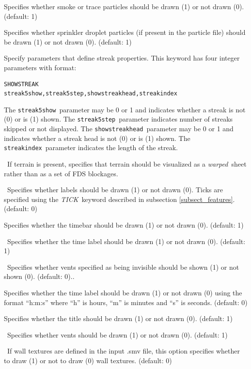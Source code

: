 \documentclass[11pt,twoside]{book}
\begin{document}
Specifies whether smoke or trace particles
should be drawn (1) or not drawn (0). (default: 1)

Specifies whether
sprinkler droplet particles (if present in the particle file)
should be drawn (1) or not drawn (0).
(default: 1)

Specify parameters that define streak properties.  This keyword
has four integer parameters with format:
\begin{lstlisting}
SHOWSTREAK
streak5show,streak5step,showstreakhead,streakindex
\end{lstlisting}
The {\tt streak5show}\ parameter may be 0 or 1 and indicates whether a
streak is not (0) or is (1) shown. The {\tt streak5step}\ parameter
indicates number of streaks skipped or not displayed.
The {\tt showstreakhead}\ parameter may be 0 or 1 and indicates
whether a streak head is not (0) or is (1) shown.
The {\tt streakindex}\ parameter indicates the length of the streak.


\ If terrain is present, specifies that terrain
should be visualized as a {\em warped}\ sheet
rather than as a set of FDS blockages.

\ Specifies whether labels should be drawn (1) or
not drawn (0).  Ticks are specified using the {\em TICK}\ keyword
described in subsection \ref{subsect_features}. (default: 0)

Specifies whether the timebar should be drawn
(1) or not drawn (0). (default: 1)

\ Specifies whether the time label should be
drawn (1) or not drawn (0). (default: 1)

\ Specifies whether vents specified as being invisible should be
shown (1) or not shown (0). (default: 0)..

Specifies whether the time label should be
drawn (1) or not drawn (0) using the format ``h:m:s'' where ``h''
is hours, ``m'' is minutes and ``s'' is seconds.  (default: 0)

Specifies whether
the title should be drawn (1) or not drawn (0).
(default: 1)

\ Specifies whether vents should be drawn
(1) or not drawn (0).  (default: 1)

\ If wall textures are defined in the input .smv file, this
option specifies whether to draw (1) or not to draw (0) wall textures.
(default: 0)
\end{document}
